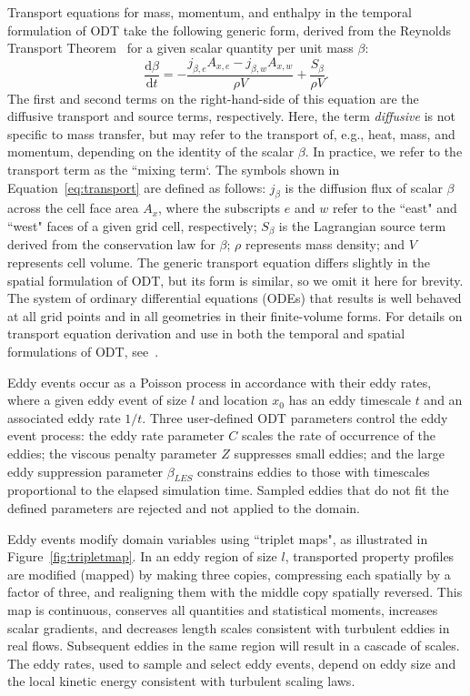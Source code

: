 \documentclass[preprint,12pt, a4paper]{elsarticle}
\begin{document}
Transport equations for mass, momentum, and enthalpy in the temporal formulation of ODT take the following generic form, derived from the Reynolds Transport Theorem~\cite{Cengel_2010} for a given scalar quantity per unit mass $\beta$: 
\begin{equation} 
\label{eq:transport}
	\frac{\mathrm{d}\beta}{\mathrm{d}t} = -\frac{j_{\beta,e}A_{x,e}-j_{\beta,w}A_{x,w}}{\rho V} + \frac{S_{\beta}}{\rho V}.
\end{equation}
The first and second terms on the right-hand-side of this equation are the diffusive transport and source terms, respectively. Here, the term \emph{diffusive} is not specific to mass transfer, but may refer to the transport of, e.g., heat, mass, and momentum, depending on the identity of the scalar $\beta$. In practice, we refer to the transport term as the ``mixing term`. The symbols shown in Equation~\ref{eq:transport} are defined as follows: $j_{\beta}$ is the diffusion flux of scalar $\beta$ across the cell face area $A_x$, where the subscripts $e$ and $w$ refer to the ``east" and ``west" faces of a given grid cell, respectively; $S_{\beta}$ is the Lagrangian source term derived from the conservation law for $\beta$; $\rho$ represents mass density; and $V$ represents cell volume. The generic transport equation differs slightly in the spatial formulation of ODT, but its form is similar, so we omit it here for brevity. The system of ordinary differential equations (ODEs) that results is well behaved at all grid points and in all geometries in their finite-volume forms. For details on transport equation derivation and use in both the temporal and spatial formulations of ODT, see~\cite{Lignell_2018}. 

Eddy events occur as a Poisson process in accordance with their eddy rates, where a given eddy event of size $l$ and location $x_0$ has an eddy timescale $t$ and an associated eddy rate $1/t$. Three user-defined ODT parameters control the eddy event process: the eddy rate parameter $C$ scales the rate of occurrence of the eddies; the viscous penalty parameter $Z$ suppresses small eddies; and the large eddy suppression parameter $\beta_{LES}$ constrains eddies to those with timescales proportional to the elapsed simulation time. Sampled eddies that do not fit the defined parameters are rejected and not applied to the domain.

Eddy events modify domain variables using ``triplet maps", as illustrated in Figure~\ref{fig:tripletmap}. In an eddy region of size $l$, transported property profiles are modified (mapped) by making three copies, compressing each spatially by a factor of three, and realigning them with the middle copy spatially reversed. This map is continuous, conserves all quantities and statistical moments, increases scalar gradients, and decreases length scales consistent with turbulent eddies in real flows. Subsequent eddies in the same region will result in a cascade of scales. The eddy rates, used to sample and select eddy events, depend on eddy size and the local kinetic energy consistent with turbulent scaling laws.  
\end{document}
